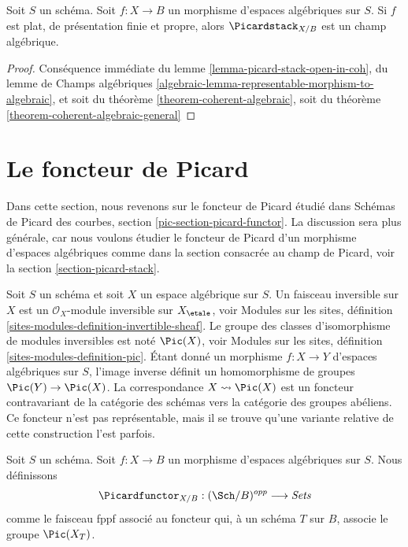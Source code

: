 \begin{proposition}
\label{proposition-pic}
Soit $S$ un schéma. Soit $f : X \to B$ un morphisme d'espaces algébriques sur
$S$. Si $f$ est plat, de présentation finie et propre, alors
$\Picardstack_{X/B}$ est un champ algébrique.
\end{proposition}

\begin{proof}
Conséquence immédiate du lemme \ref{lemma-picard-stack-open-in-coh}, du lemme
de Champs algébriques
\ref{algebraic-lemma-representable-morphism-to-algebraic}, et soit du théorème
\ref{theorem-coherent-algebraic}, soit du théorème
\ref{theorem-coherent-algebraic-general}
\end{proof}

\section{Le foncteur de Picard}
\label{section-picard-functor}

\noindent
Dans cette section, nous revenons sur le foncteur de Picard étudié dans
Schémas de Picard des courbes, section \ref{pic-section-picard-functor}.
La discussion sera plus générale, car nous voulons étudier le foncteur de
Picard d'un morphisme d'espaces algébriques comme dans la section consacrée au
champ de Picard, voir la section \ref{section-picard-stack}.

\medskip\noindent
Soit $S$ un schéma et soit $X$ un espace algébrique sur $S$.
Un faisceau inversible sur $X$ est un $\mathcal{O}_X$-module inversible
sur $X_\etale$, voir
Modules sur les sites, définition \ref{sites-modules-definition-invertible-sheaf}.
Le groupe des classes d'isomorphisme de modules inversibles est noté
$\Pic(X)$, voir
Modules sur les sites, définition \ref{sites-modules-definition-pic}.
Étant donné un morphisme $f : X \to Y$ d'espaces algébriques sur $S$,
l'image inverse définit un homomorphisme de groupes $\Pic(Y) \to \Pic(X)$.
La correspondance
$X \leadsto \Pic(X)$ est un foncteur contravariant de la catégorie
des schémas vers la catégorie des groupes abéliens. Ce foncteur n'est pas
représentable, mais il se trouve qu'une variante relative de cette construction
l'est parfois.

\begin{situation}
\label{situation-pic}
Soit $S$ un schéma.
Soit $f : X \to B$ un morphisme d'espaces algébriques sur $S$.
Nous définissons
$$
\Picardfunctor_{X/B} : (\Sch/B)^{opp} \longrightarrow \textit{Sets}
$$
comme le faisceau fppf associé au foncteur qui, à un schéma $T$
sur $B$, associe le groupe $\Pic(X_T)$.
\end{situation}

